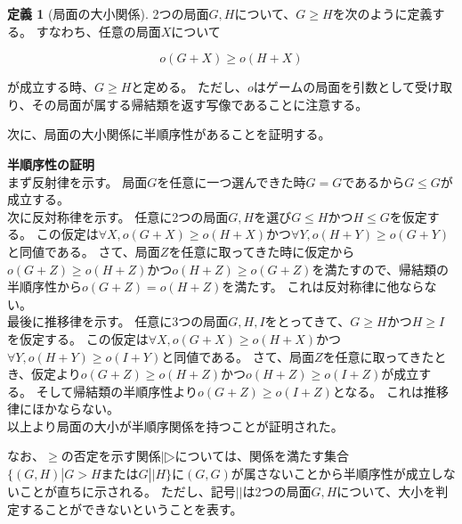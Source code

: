 \documentclass[uplatex,dvipdfmx,a4paper,10pt]{jsarticle}
\makeatletter
\theoremstyle{definition}
\newtheorem{dfn}[thm]{定義}
\renewenvironment{proof}[1][\proofname]{\par
  \pushQED{\qed}%
  \normalfont \topsep6\p@\@plus6\p@\relax
  \trivlist
  \item\relax
  {\bfseries
  #1\@addpunct{.}}\hspace\labelsep\ignorespaces
}{%
  \popQED\endtrivlist\@endpefalse
}
\makeatother
\begin{document}
\begin{dfn}[局面の大小関係] 
2つの局面\(G, H\)について、\(G \geq H\)を次のように定義する。
すなわち、任意の局面\(X\)について

\begin{equation}
  o(G + X) \geq o(H + X)
\end{equation}

\noindent が成立する時、\(G \geq H\)と定める。
ただし、\(o\)はゲームの局面を引数として受け取り、その局面が属する帰結類を返す写像であることに注意する。
\label{dfn_comparision_game}
\end{dfn}

次に、局面の大小関係に半順序性があることを証明する。

\begin{proof}[半順序性の証明] \\
  \hspace{1em}まず反射律を示す。
  局面\(G\)を任意に一つ選んできた時\(G = G\)であるから\(G \leq G\)が成立する。 \\
  \hspace{1em}次に反対称律を示す。
  任意に2つの局面\(G, H\)を選び\(G \leq H\)かつ\(H \leq G\)を仮定する。
  この仮定は\(\forall X, o(G + X) \geq o(H + X)\)かつ\(\forall Y, o(H + Y) \geq o(G + Y)\)と同値である。
  さて、局面\(Z\)を任意に取ってきた時に仮定から\(o(G + Z) \geq o(H + Z)\)かつ\(o(H + Z) \geq o(G + Z)\)を満たすので、帰結類の半順序性から\(o(G + Z) = o(H + Z)\)を満たす。
  これは反対称律に他ならない。 \\
  \hspace{1em}最後に推移律を示す。
  任意に3つの局面\(G, H, I\)をとってきて、\(G \geq H\)かつ\(H \geq I\)を仮定する。
  この仮定は\(\forall X, o(G + X) \geq o(H + X)\)かつ\(\forall Y, o(H + Y) \geq o(I + Y)\)と同値である。
  さて、局面\(Z\)を任意に取ってきたとき、仮定より\(o(G + Z) \geq o(H + Z)\)かつ\(o(H + Z) \geq o(I + Z)\)が成立する。
  そして帰結類の半順序性より\(o(G + Z) \geq o(I + Z)\)となる。
  これは推移律にほかならない。 \\
  \hspace{1em}以上より局面の大小が半順序関係を持つことが証明された。
  \label{proof_partial_order}
\end{proof}

なお、\(\geq\)の否定を示す関係\(|▷\)については、関係を満たす集合\(\{(G, H) | G > H \text{または} G || H\}\)に\((G, G)\)が属さないことから半順序性が成立しないことが直ちに示される。
ただし、記号\(||\)は2つの局面\(G, H\)について、大小を判定することができないということを表す。
\end{document}
